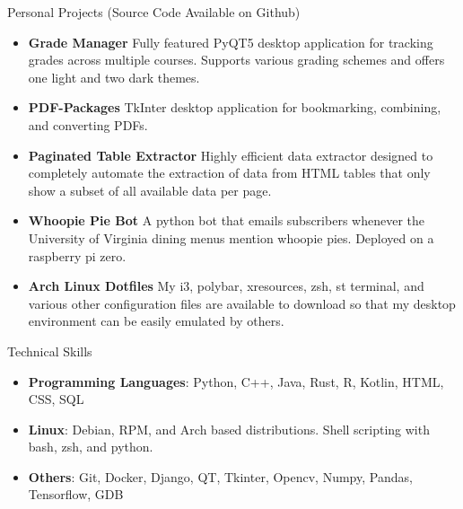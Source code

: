 \documentclass[]{mcdowellcv}
\begin{document}
\begin{cvsection}{Personal Projects (Source Code Available on Github)}
	\begin{cvsubsection}{}{}{}
		\begin{itemize}
			\setlength\itemsep{3pt}
			\item \textbf{Grade Manager}  Fully featured PyQT5 desktop application for tracking grades across multiple courses. Supports various grading schemes and offers one light and two dark themes.
			\item \textbf{PDF-Packages}  TkInter desktop application for bookmarking, combining, and converting PDFs.
			\item \textbf{Paginated Table Extractor}  Highly efficient data extractor designed to completely automate the extraction of data from HTML tables that only show a subset of all available data per page. 
			\item \textbf{Whoopie Pie Bot}  A python bot that emails subscribers whenever the University of Virginia dining menus mention whoopie pies.  Deployed on a raspberry pi zero. 
			\item \textbf{Arch Linux Dotfiles}  My i3, polybar, xresources, zsh, st terminal, and various other configuration files are available to download so that my desktop environment can be easily emulated by others.
		\end{itemize}
	\end{cvsubsection}
\end{cvsection}
\begin{cvsection}{Technical Skills}
	\begin{cvsubsection}{}{}{}
		\begin{itemize}
			\item \textbf{Programming Languages}:  Python, C++, Java, Rust, R, Kotlin, HTML, CSS, SQL
			\item \textbf{Linux}: Debian, RPM, and Arch based distributions. Shell scripting with bash, zsh, and python.
			\item \textbf{Others}:  Git, Docker, Django, QT, Tkinter, Opencv, Numpy, Pandas, Tensorflow, GDB
		\end{itemize}
	\end{cvsubsection}
\end{cvsection}

\ 
\end{document}
